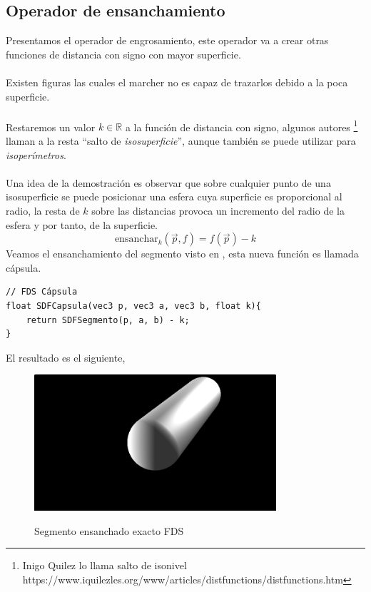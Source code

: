 \subsection{Operador de ensanchamiento}
Presentamos el operador de engrosamiento, este operador va a crear otras funciones de distancia con signo con mayor superficie.\\\\
Existen figuras las cuales el marcher no es capaz de trazarlos debido a la poca superficie.\\\\  Restaremos un valor \(k\in\mathbb{R}\) a la función de distancia con signo, algunos autores \footnote{Inigo Quilez lo llama salto de isonivel https://www.iquilezles.org/www/articles/distfunctions/distfunctions.htm} llaman a la resta \enquote{salto de \textit{isosuperficie}}, aunque también se puede utilizar para \textit{isoperímetros}.\\\\ Una idea de la demostración es observar que sobre cualquier punto de una isosuperficie se puede posicionar una esfera cuya superficie es proporcional al radio, la resta de \(k\) sobre las distancias provoca un incremento del radio de la esfera y por tanto, de la superficie.  
\[\text{ensanchar}_k(\Vec{p}, f)=f(\Vec{p})-k\]
Veamos el ensanchamiento del segmento visto en , esta nueva función es llamada cápsula.
\begin{lstlisting}
// FDS Cápsula
float SDFCapsula(vec3 p, vec3 a, vec3 b, float k){
	return SDFSegmento(p, a, b) - k;
}
\end{lstlisting}
El resultado es el siguiente,
\begin{figure}[H]
  \centering
  \captionsetup{justification=centering}%
  \includegraphics[width=0.8\textwidth]{secciones/imagenes/sdf/3d/sdf_capsula.png}\label{fig:capsula}
  \caption{Segmento ensanchado exacto FDS}
\end{figure}

